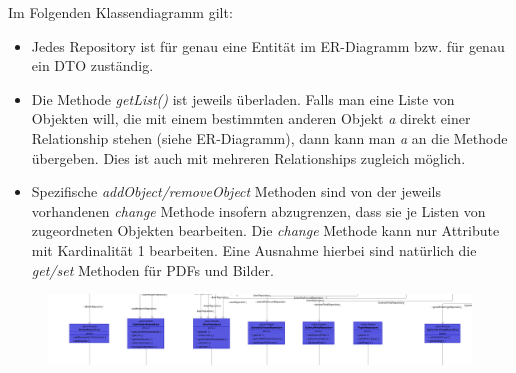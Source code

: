Im Folgenden Klassendiagramm gilt:
\begin{itemize}
	\item Jedes Repository ist für genau eine Entität im ER-Diagramm bzw. für genau ein DTO zuständig.
	\item Die Methode \emph{getList()} ist jeweils überladen. Falls man eine Liste von Objekten will, die mit einem bestimmten anderen Objekt \emph{a} direkt einer Relationship stehen (siehe ER-Diagramm), dann kann man \emph{a} an die Methode übergeben. Dies ist auch mit mehreren Relationships zugleich möglich.
	\item Spezifische \emph{addObject/removeObject} Methoden sind von der jeweils vorhandenen \emph{change} Methode insofern abzugrenzen, dass sie je Listen von zugeordneten Objekten bearbeiten. Die \emph{change} Methode kann nur Attribute mit Kardinalität 1 bearbeiten. Eine Ausnahme hierbei sind natürlich die \emph{get/set} Methoden für PDFs und Bilder.
\end{itemize}

\begin{figure}[H]
	\centering
	\includegraphics[width=0.9\linewidth]{graphics/persistence_repository}
\end{figure}


